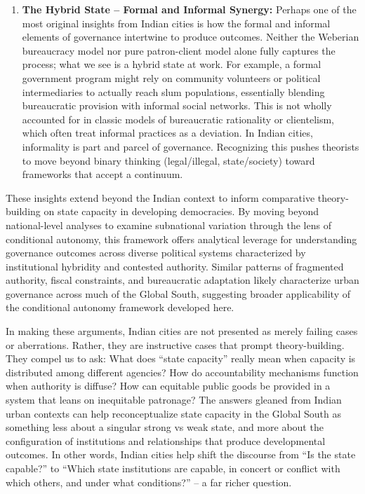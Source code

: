 \begin{enumerate}
\item \textbf{The Hybrid State – Formal and Informal Synergy:} Perhaps one of the most original insights from Indian cities is how the formal and informal elements of governance intertwine to produce outcomes. Neither the Weberian bureaucracy model nor pure patron-client model alone fully captures the process; what we see is a hybrid state at work. For example, a formal government program might rely on community volunteers or political intermediaries to actually reach slum populations, essentially blending bureaucratic provision with informal social networks. This is not wholly accounted for in classic models of bureaucratic rationality or clientelism, which often treat informal practices as a deviation. In Indian cities, informality is part and parcel of governance. Recognizing this pushes theorists to move beyond binary thinking (legal/illegal, state/society) toward frameworks that accept a continuum.
\end{enumerate}

These insights extend beyond the Indian context to inform comparative theory-building on state capacity in developing democracies. By moving beyond national-level analyses to examine subnational variation through the lens of conditional autonomy, this framework offers analytical leverage for understanding governance outcomes across diverse political systems characterized by institutional hybridity and contested authority. Similar patterns of fragmented authority, fiscal constraints, and bureaucratic adaptation likely characterize urban governance across much of the Global South, suggesting broader applicability of the conditional autonomy framework developed here.

In making these arguments, Indian cities are not presented as merely failing cases or aberrations. Rather, they are instructive cases that prompt theory-building. They compel us to ask: What does ``state capacity'' really mean when capacity is distributed among different agencies? How do accountability mechanisms function when authority is diffuse? How can equitable public goods be provided in a system that leans on inequitable patronage? The answers gleaned from Indian urban contexts can help reconceptualize state capacity in the Global South as something less about a singular strong vs weak state, and more about the configuration of institutions and relationships that produce developmental outcomes. In other words, Indian cities help shift the discourse from ``Is the state capable?'' to ``Which state institutions are capable, in concert or conflict with which others, and under what conditions?'' – a far richer question.

